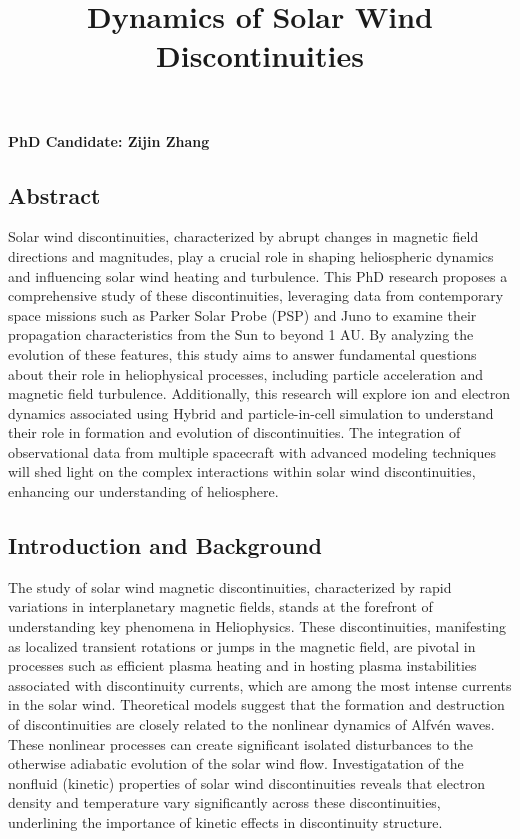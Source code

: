\documentclass[
  letterpaper,
  DIV=11,
  numbers=noendperiod]{scrartcl}
\title{Dynamics of Solar Wind Discontinuities}
\author{}
\date{}
\begin{document}
\maketitle

\vspace{-20truemm}

\textbf{PhD Candidate: Zijin Zhang}

\subsection{Abstract}\label{abstract}

Solar wind discontinuities, characterized by abrupt changes in magnetic field directions and magnitudes, play a crucial role in shaping heliospheric dynamics and influencing solar wind heating and turbulence. This PhD research proposes a comprehensive study of these discontinuities, leveraging data from contemporary space missions such as Parker Solar Probe (PSP) and Juno to examine their propagation characteristics from the Sun to beyond 1 AU. By analyzing the evolution of these features, this study aims to answer fundamental questions about their role in heliophysical processes, including particle acceleration and magnetic field turbulence. Additionally, this research will explore ion and electron dynamics associated using Hybrid and particle-in-cell simulation to understand their role in formation and evolution of discontinuities. The integration of observational data from multiple spacecraft with advanced modeling techniques will shed light on the complex interactions within solar wind discontinuities, enhancing our understanding of heliosphere.

\subsection{Introduction and Background}\label{introduction-and-background}

The study of solar wind magnetic discontinuities, characterized by rapid variations in interplanetary magnetic fields, stands at the forefront of understanding key phenomena in Heliophysics. These discontinuities, manifesting as localized transient rotations or jumps in the magnetic field, are pivotal in processes such as efficient plasma heating and in hosting plasma instabilities associated with discontinuity currents, which are among the most intense currents in the solar wind. Theoretical models suggest that the formation and destruction of discontinuities are closely related to the nonlinear dynamics of Alfvén waves. These nonlinear processes can create significant isolated disturbances to the otherwise adiabatic evolution of the solar wind flow. Investigatation of the nonfluid (kinetic) properties of solar wind discontinuities reveals that electron density and temperature vary significantly across these discontinuities, underlining the importance of kinetic effects in discontinuity structure.
\end{document}
